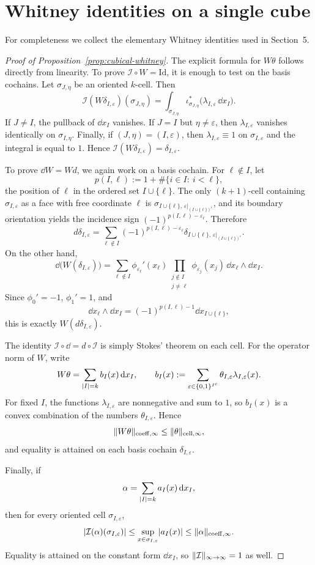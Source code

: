 \section{Whitney identities on a single cube}

For completeness we collect the elementary Whitney identities used in
Section~5.

\begin{proof}[Proof of Proposition~\ref{prop:cubical-whitney}]
The explicit formula for $W\theta$ follows directly from linearity. To prove
$\mathcal I\circ W=\mathrm{Id}$, it is enough to test on the basis cochains.
Let $\sigma_{J,\eta}$ be an oriented $k$-cell. Then
\[
\mathcal I(W\delta_{I,\varepsilon})(\sigma_{J,\eta})=
\int_{\sigma_{J,\eta}}
\iota_{\sigma_{J,\eta}}^\ast\!\bigl(\lambda_{I,\varepsilon}\,\dd x_I\bigr).
\]
If $J\neq I$, the pullback of $\dd x_I$ vanishes. If $J=I$ but
$\eta\neq\varepsilon$, then $\lambda_{I,\varepsilon}$ vanishes identically on
$\sigma_{I,\eta}$. Finally, if $(J,\eta)=(I,\varepsilon)$, then
$\lambda_{I,\varepsilon}\equiv 1$ on $\sigma_{I,\varepsilon}$ and the integral
is equal to $1$. Hence $\mathcal I(W\delta_{I,\varepsilon})=\delta_{I,\varepsilon}$.

To prove $\dd W=Wd$, we again work on a basis cochain. For $\ell\notin I$, let
\[
p(I,\ell):=1+\#\{i\in I:\ i<\ell\},
\]
the position of $\ell$ in the ordered set $I\cup\{\ell\}$. The only
$(k+1)$-cell containing $\sigma_{I,\varepsilon}$ as a face with free
coordinate $\ell$ is
$\sigma_{I\cup\{\ell\},\,\varepsilon|_{(I\cup\{\ell\})^c}}$, and its boundary
orientation yields the incidence sign $(-1)^{p(I,\ell)-\varepsilon_\ell}$.
Therefore
\[
d\delta_{I,\varepsilon}=
\sum_{\ell\notin I}
(-1)^{p(I,\ell)-\varepsilon_\ell}
\delta_{I\cup\{\ell\},\,\varepsilon|_{(I\cup\{\ell\})^c}}.
\]
On the other hand,
\[
\dd\bigl(W(\delta_{I,\varepsilon})\bigr)=
\sum_{\ell\notin I}
\phi_{\varepsilon_\ell}'(x_\ell)
\prod_{\substack{j\notin I\\ j\neq \ell}}
\phi_{\varepsilon_j}(x_j)\,
\dd x_\ell\wedge \dd x_I.
\]
Since $\phi_0'=-1$, $\phi_1'=1$, and
\[
\dd x_\ell\wedge \dd x_I=(-1)^{p(I,\ell)-1}\dd x_{I\cup\{\ell\}},
\]
this is exactly $W(d\delta_{I,\varepsilon})$.

The identity $\mathcal I\circ \dd=d\circ \mathcal I$ is simply Stokes' theorem
on each cell. For the operator norm of $W$, write
\[
W\theta=
\sum_{\lvert I \rvert=k} b_I(x)\,\mathrm{d} x_I,
\qquad
b_I(x):=
\sum_{\varepsilon\in\{0,1\}^{I^c}}
\theta_{I,\varepsilon}\lambda_{I,\varepsilon}(x).
\]
For fixed $I$, the functions $\lambda_{I,\varepsilon}$ are nonnegative and sum
to $1$, so $b_I(x)$ is a convex combination of the numbers
$\theta_{I,\varepsilon}$. Hence
\[
\lVert W\theta \rVert_{\mathrm{coeff},\infty}\le\lVert \theta \rVert_{\mathrm{cell},\infty},
\]
and equality is attained on each basis cochain $\delta_{I,\varepsilon}$.

Finally, if
\[
\alpha=\sum_{\lvert I \rvert=k} a_I(x)\,\mathrm{d} x_I,
\]
then for every oriented cell $\sigma_{I,\varepsilon}$,
\[
\lvert \mathcal I(\alpha)(\sigma_{I,\varepsilon}) \rvert
\le
\sup_{x\in \sigma_{I,\varepsilon}}\lvert a_I(x) \rvert
\le
\lVert \alpha \rVert_{\mathrm{coeff},\infty}.
\]
Equality is attained on the constant form $\dd x_I$, so
$\lVert \mathcal I \rVert_{\infty\to\infty}=1$ as well.
\end{proof}

